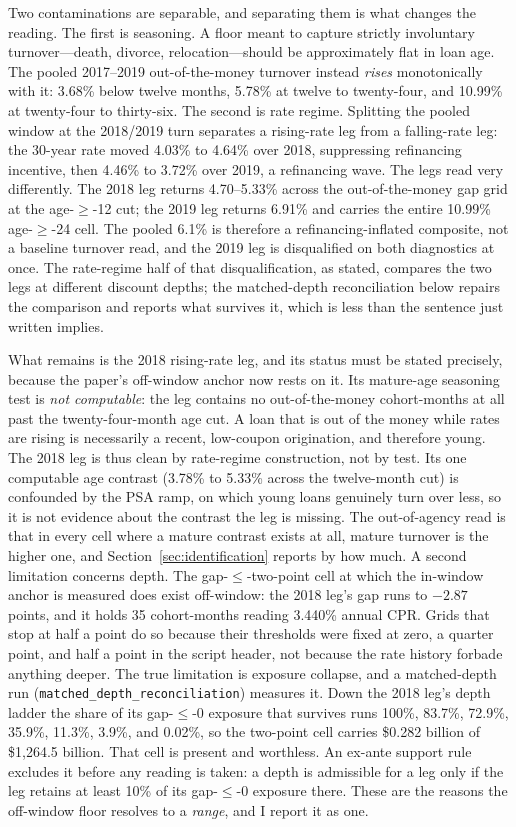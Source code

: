 \documentclass[12pt]{article}
\begin{document}
Two contaminations are separable, and separating them is what changes the reading. The first is seasoning. A floor meant to capture strictly involuntary turnover---death, divorce, relocation---should be approximately flat in loan age. The pooled 2017--2019 out-of-the-money turnover instead \emph{rises} monotonically with it: 3.68\% below twelve months, 5.78\% at twelve to twenty-four, and 10.99\% at twenty-four to thirty-six. The second is rate regime. Splitting the pooled window at the 2018/2019 turn separates a rising-rate leg from a falling-rate leg: the 30-year rate moved 4.03\% to 4.64\% over 2018, suppressing refinancing incentive, then 4.46\% to 3.72\% over 2019, a refinancing wave. The legs read very differently. The 2018 leg returns 4.70--5.33\% across the out-of-the-money gap grid at the age-$\geq$-12 cut; the 2019 leg returns 6.91\% and carries the entire 10.99\% age-$\geq$-24 cell. The pooled 6.1\% is therefore a refinancing-inflated composite, not a baseline turnover read, and the 2019 leg is disqualified on both diagnostics at once. The rate-regime half of that disqualification, as stated, compares the two legs at different discount depths; the matched-depth reconciliation below repairs the comparison and reports what survives it, which is less than the sentence just written implies.

What remains is the 2018 rising-rate leg, and its status must be stated precisely, because the paper's off-window anchor now rests on it. Its mature-age seasoning test is \emph{not computable}: the leg contains no out-of-the-money cohort-months at all past the twenty-four-month age cut. A loan that is out of the money while rates are rising is necessarily a recent, low-coupon origination, and therefore young. The 2018 leg is thus clean by rate-regime construction, not by test. Its one computable age contrast (3.78\% to 5.33\% across the twelve-month cut) is confounded by the PSA ramp, on which young loans genuinely turn over less, so it is not evidence about the contrast the leg is missing. The out-of-agency read is that in every cell where a mature contrast exists at all, mature turnover is the higher one, and Section~\ref{sec:identification} reports by how much. A second limitation concerns depth. The gap-$\leq$-two-point cell at which the in-window anchor is measured does exist off-window: the 2018 leg's gap runs to $-2.87$ points, and it holds 35 cohort-months reading 3.440\% annual CPR. Grids that stop at half a point do so because their thresholds were fixed at zero, a quarter point, and half a point in the script header, not because the rate history forbade anything deeper. The true limitation is exposure collapse, and a matched-depth run (\texttt{matched\_depth\_reconciliation}) measures it. Down the 2018 leg's depth ladder the share of its gap-$\leq$-0 exposure that survives runs 100\%, 83.7\%, 72.9\%, 35.9\%, 11.3\%, 3.9\%, and 0.02\%, so the two-point cell carries \$0.282 billion of \$1{,}264.5 billion. That cell is present and worthless. An ex-ante support rule excludes it before any reading is taken: a depth is admissible for a leg only if the leg retains at least 10\% of its gap-$\leq$-0 exposure there. These are the reasons the off-window floor resolves to a \emph{range}, and I report it as one.
\end{document}
